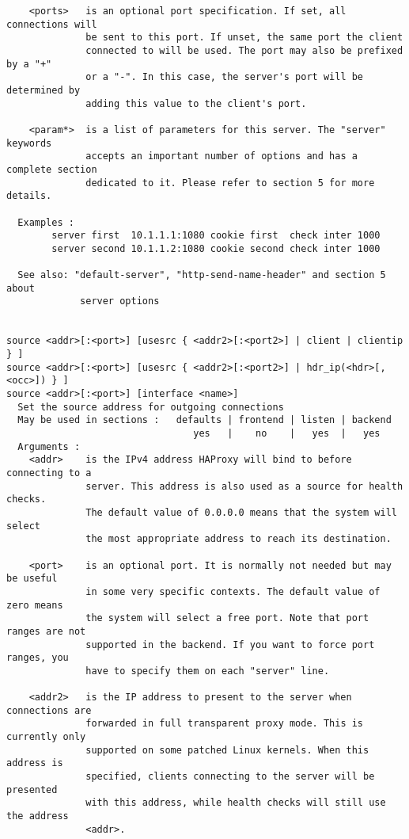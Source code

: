 \begin{verbatim}
    <ports>   is an optional port specification. If set, all connections will
              be sent to this port. If unset, the same port the client
              connected to will be used. The port may also be prefixed by a "+"
              or a "-". In this case, the server's port will be determined by
              adding this value to the client's port.

    <param*>  is a list of parameters for this server. The "server" keywords
              accepts an important number of options and has a complete section
              dedicated to it. Please refer to section 5 for more details.

  Examples :
        server first  10.1.1.1:1080 cookie first  check inter 1000
        server second 10.1.1.2:1080 cookie second check inter 1000

  See also: "default-server", "http-send-name-header" and section 5 about
             server options


source <addr>[:<port>] [usesrc { <addr2>[:<port2>] | client | clientip } ]
source <addr>[:<port>] [usesrc { <addr2>[:<port2>] | hdr_ip(<hdr>[,<occ>]) } ]
source <addr>[:<port>] [interface <name>]
  Set the source address for outgoing connections
  May be used in sections :   defaults | frontend | listen | backend
                                 yes   |    no    |   yes  |   yes
  Arguments :
    <addr>    is the IPv4 address HAProxy will bind to before connecting to a
              server. This address is also used as a source for health checks.
              The default value of 0.0.0.0 means that the system will select
              the most appropriate address to reach its destination.

    <port>    is an optional port. It is normally not needed but may be useful
              in some very specific contexts. The default value of zero means
              the system will select a free port. Note that port ranges are not
              supported in the backend. If you want to force port ranges, you
              have to specify them on each "server" line.

    <addr2>   is the IP address to present to the server when connections are
              forwarded in full transparent proxy mode. This is currently only
              supported on some patched Linux kernels. When this address is
              specified, clients connecting to the server will be presented
              with this address, while health checks will still use the address
              <addr>.


\end{verbatim}
